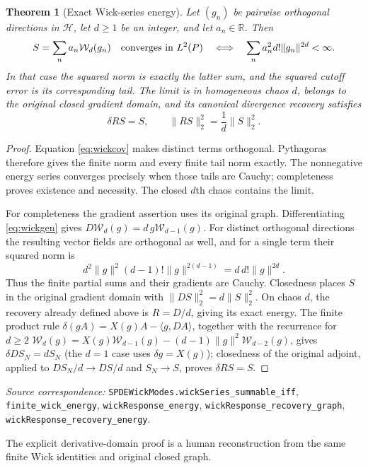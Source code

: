 \documentclass[11pt]{article}
\newtheorem{theorem}{Theorem}[section]
\newcommand{\R}{\mathbb R}\newcommand{\E}{\mathbb E}
\newcommand{\Hh}{\mathcal H}\newcommand{\tr}{\operatorname{tr}}
\newcommand{\code}[1]{{\small\nolinkurl{#1}}}
\begin{document}
\begin{theorem}[Exact Wick-series energy]\label{thm:wickseries}
Let $(g_n)$ be pairwise orthogonal directions in $\Hh$, let $d\geq1$
be an integer, and let $a_n\in\R$. Then
\[
 S=\sum_n a_n\mathcal W_d(g_n)\quad\hbox{converges in }L^2(P)
 \quad\Longleftrightarrow\quad
 \sum_n a_n^2d!\|g_n\|^{2d}<\infty.
\]
In that case the squared norm is exactly the latter sum, and the
squared cutoff error is its corresponding tail. The limit is in
homogeneous chaos $d$, belongs to the original closed gradient domain,
and its canonical divergence recovery satisfies
\[
 \delta RS=S,\qquad \|RS\|_2^2=\frac1d\|S\|_2^2.
\]
\end{theorem}
\begin{proof}
Equation \eqref{eq:wickcov} makes distinct terms orthogonal. Pythagoras
therefore gives the finite norm and every finite tail norm exactly.
The nonnegative energy series converges precisely when those tails
are Cauchy; completeness proves existence and necessity. The closed
$d$th chaos contains the limit.

For completeness the gradient assertion uses its original graph.
Differentiating \eqref{eq:wickgen} gives
$D\mathcal W_d(g)=d\,g\mathcal W_{d-1}(g)$.
For distinct orthogonal directions the resulting vector fields are
orthogonal as well, and for a single term their squared norm is
\[
 d^2\|g\|^2(d-1)!\|g\|^{2(d-1)}
       =d\,d!\|g\|^{2d}.
\]
Thus the finite partial sums and their gradients are Cauchy. Closedness
places $S$ in the original gradient domain with
$\|DS\|_2^2=d\|S\|_2^2$. On chaos $d$, the recovery already defined
above is $R=D/d$, giving its exact energy. The finite product rule
$\delta(gA)=X(g)A-\langle g,DA\rangle$, together with the recurrence for $d\geq2$
$\mathcal W_d(g)=X(g)\mathcal W_{d-1}(g)
 -(d-1)\|g\|^2\mathcal W_{d-2}(g)$, gives
$\delta DS_N=dS_N$ (the $d=1$ case uses $\delta g=X(g)$);
closedness of the original adjoint, applied to
$DS_N/d\to DS/d$ and $S_N\to S$, proves $\delta RS=S$.
\end{proof}
\par\smallskip\begingroup\small\raggedright
\noindent\textit{Source correspondence:}
\code{SPDEWickModes.wickSeries_summable_iff},
\code{finite_wick_energy}, \code{wickResponse_energy},
\code{wickResponse_recovery_graph}, \code{wickResponse_recovery_energy}.\par\endgroup
The explicit derivative-domain proof is a human reconstruction from the
same finite Wick identities and original closed graph.
\end{document}
